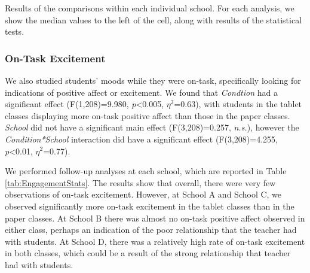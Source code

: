\documentclass{sigchi}
\begin{document}
\begin{table}[t]
\begin{center}

\end{center}
\vspace{0.05in}
\caption{\label{tab:EngagementStats} Results of the comparisons within each individual school. For each analysis, we show the median values to the left of the cell, along with results of the statistical tests.}
\end{table}

\subsubsection{On-Task Excitement}
We also studied students' moods while they were on-task, specifically looking for indications of positive affect or excitement. We found that \emph{Condtion} had a significant effect (F(1,208)=9.980, \emph{p}\textless0.005, $\eta^2$=0.63), with students in the tablet classes displaying more on-task positive affect than those in the paper classes. \emph{School} did not have a significant main effect (F(3,208)=0.257, \emph{n.s.}), however the \emph{Condition*School} interaction did have a significant effect (F(3,208)=4.255, \emph{p}\textless0.01, $\eta^2$=0.77).

We performed follow-up analyses at each school, which are reported in Table \ref{tab:EngagementStats}. The results show that overall, there were very few observations of on-task excitement. However, at School A and School C, we observed significantly more on-task excitement in the tablet classes than in the paper classes. At School B there was almost no on-task positive affect observed in either class, perhaps an indication of the poor relationship that the teacher had with students. At School D, there was a relatively high rate of on-task excitement in both classes, which could be a result of the strong relationship that teacher had with students.


%
%
\end{document}
